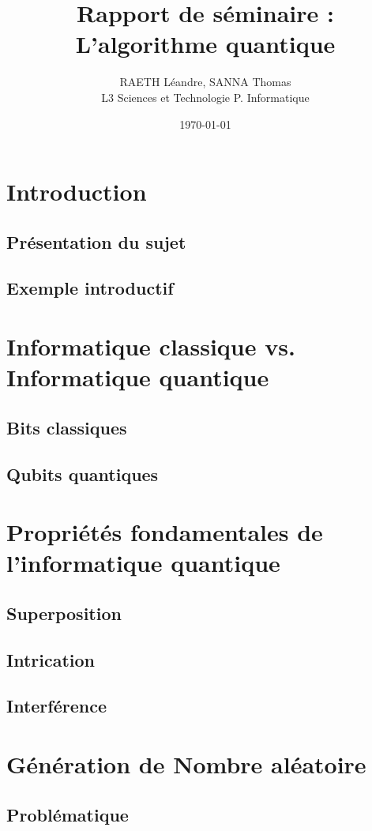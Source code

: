 \documentclass{article}
\title{Rapport de séminaire :\\L'algorithme quantique}
\author{RAETH Léandre, SANNA Thomas\\L3 Sciences et Technologie  P. Informatique}
\date{\today}
\begin{document}
\maketitle

\break\section{Introduction}
\subsection{Présentation du sujet}
\subsection{Exemple introductif}

\break\section{Informatique classique vs. Informatique quantique}
\subsection{Bits classiques}
\subsection{Qubits quantiques}

\break\section{Propriétés fondamentales de l'informatique quantique}
\subsection{Superposition}
\subsection{Intrication}
\subsection{Interférence}

\break\section{Génération de Nombre aléatoire}
\subsection{Problématique}
\end{document}
